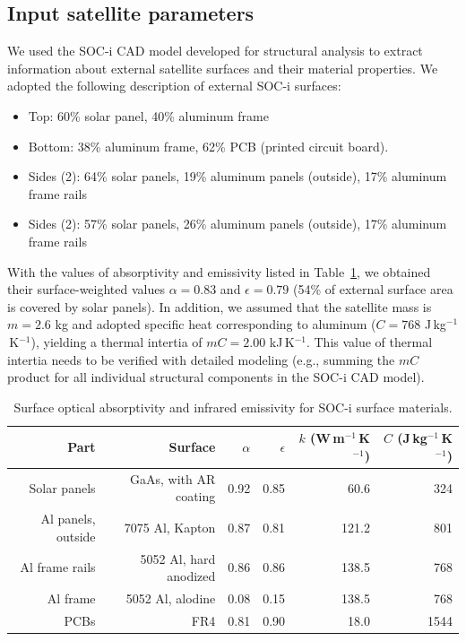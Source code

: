 \documentclass[]{aastex62}
\begin{document}
\subsection{Input satellite parameters}

We used the SOC-i CAD model developed for structural analysis to extract information about
external satellite surfaces and their material properties. We adopted the following description 
of external SOC-i surfaces: 
\begin{itemize}
\item  Top: 60\% solar panel, 40\% aluminum frame
\item  Bottom: 38\% aluminum frame, 62\% PCB (printed circuit board). 
\item  Sides (2): 64\% solar panels, 19\% aluminum panels (outside), 17\% aluminum frame rails
\item  Sides (2): 57\% solar panels, 26\% aluminum panels (outside), 17\% aluminum frame rails
\end{itemize}

With the values of absorptivity and emissivity listed in Table~\ref{tab:inputsAbsEmiss}, we obtained
their surface-weighted values $\alpha=0.83$ and $\epsilon=0.79$ (54\% of external surface area
is covered by solar panels). In addition, we assumed that the satellite mass is $m=2.6$ kg and 
adopted specific heat corresponding to aluminum ($C=768$  J\,kg$^{-1}$\,K$^{-1}$), yielding a
thermal intertia of $mC = 2.00$ kJ\,K$^{-1}$. This value of thermal intertia needs to be verified with 
detailed modeling (e.g., summing the $mC$ product for all individual structural components
in the SOC-i CAD model). 

\begin{table}[t]
	\centering
	\caption{Surface optical absorptivity and infrared emissivity for SOC-i surface materials. }
	\label{tab:inputsAbsEmiss}
	\begin{tabular}{r|r|r|r|r|r} %
		\hline
  	              Part        &                Surface          &    $\alpha$  &   $\epsilon$    &   $k$ (W\,m$^{-1}$\,K$^{-1}$)   &  $C$ (J\,kg$^{-1}$\,K$^{-1}$)  \\
	  	\hline
         Solar panels        &       GaAs, with AR coating  &           0.92      &          0.85      &   60.6    &      324   \\  
     Al panels, outside   &     7075 Al, Kapton             &           0.87       &         0.81       &  121.2   &    801   \\ 
          Al frame rails    &       5052 Al, hard anodized &          0.86        &        0.86      &    138.5   &    768    \\  
                Al frame      &       5052 Al, alodine            &          0.08        &        0.15       &   138.5   &    768    \\
                PCBs            &               FR4                        &           0.81       &         0.90        &   18.0  &    1544  \\ 
 		\hline     
	\end{tabular} 
\end{table}
 
\end{document}
